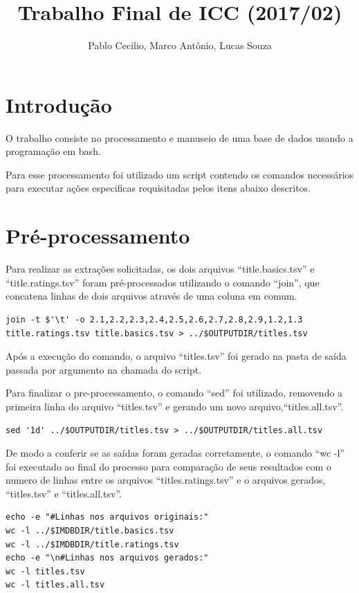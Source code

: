 \documentclass[12pt]{article}
\title{Trabalho Final de ICC (2017/02)}
\author{Pablo Cecilio, Marco Antônio, Lucas Souza}
\date{}
\begin{document}
\maketitle

\section{Introdução}

O trabalho consiste no processamento e manuseio de uma base de dados usando a programação em bash.

Para esse processamento foi utilizado um script contendo os comandos necessários para executar ações especificas requisitadas pelos itens abaixo descritos.

\section{Pré-processamento}

Para realizar as extrações solicitadas, os dois arquivos ``title.basics.tsv'' e ``title.ratings.tsv'' foram pré-processados utilizando o comando ``join'',  que concatena linhas de dois arquivos através de uma coluna em comum.

\begin{verbatim}
join -t $'\t' -o 2.1,2.2,2.3,2.4,2.5,2.6,2.7,2.8,2.9,1.2,1.3 title.ratings.tsv title.basics.tsv > ../$OUTPUTDIR/titles.tsv
\end{verbatim}

Após a execução do comando, o arquivo ``titles.tsv'' foi gerado na pasta de saída passada por argumento na chamada do script.

Para finalizar o pre-processamento, o comando ``sed'' foi utilizado, removendo a primeira linha do arquivo ``titles.tsv'' e gerando um novo arquivo,``titles.all.tsv''. 

\begin{verbatim}
sed '1d' ../$OUTPUTDIR/titles.tsv > ../$OUTPUTDIR/titles.all.tsv
\end{verbatim}

De modo a conferir se as saídas foram geradas corretamente, o comando ``wc -l'' foi executado ao final do processo para comparação de seus resultados com o numero de linhas entre os arquivos ``titles.ratings.tsv'' e o arquivos gerados, ``titles.tsv'' e ``titles.all.tsv''.

\begin{verbatim}
echo -e "#Linhas nos arquivos originais:"
wc -l ../$IMDBDIR/title.basics.tsv
wc -l ../$IMDBDIR/title.ratings.tsv
echo -e "\n#Linhas nos arquivos gerados:"
wc -l titles.tsv
wc -l titles.all.tsv
\end{verbatim}
\end{document}
